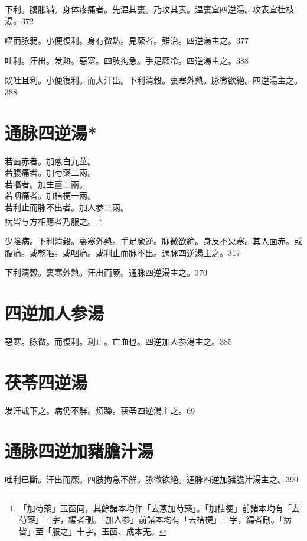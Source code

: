 \documentclass[12pt,twoside,UTF8,b5paper]{ctexbook}
\begin{document}
下利。腹{胀}滿。身体疼痛者。先温其裏。乃攻其表。温裏宜四逆湯。攻表宜桂枝湯。372

嘔而脉弱。小便復利。身有微熱。見厥者。難治。四逆湯主之。377

吐利。汗出。发熱。惡寒。四肢拘急。手足厥冷。四逆湯主之。388

既吐且利。小便復利。而大汗出。下利清穀。裏寒外熱。脉微欲絶。四逆湯主之。388

\section{通脉四逆湯*}

{若}面赤者。加蔥{白}九莖。\\
{若}腹痛者。加芍藥二兩。\\
{若}嘔者。加生薑二兩。\\
{若}咽痛者。加桔梗一兩。\\
{若}利止而脉不出者。加人参二兩。\\
{病皆与方相應者乃服之。}
	\footnote{「加芍藥」玉函同，其餘諸本均作「去蔥加芍藥」。「加桔梗」前諸本均有「去芍藥」三字，編者刪。「加人参」前諸本均有「去桔梗」三字，編者刪。「病皆」至「服之」十字，玉函、成本无。}

少陰病。下利清穀。裏寒外熱。手足厥逆。脉微欲絶。身反不惡寒。其人面赤。或腹痛。或乾嘔。或咽痛。或利止而脉不出。通脉四逆湯主之。317

下利清穀。裏寒外熱。汗出而厥。通脉四逆湯主之。370

\section{四逆加人参湯}

惡寒。脉微。而復利。利止。亡血也。四逆加人参湯主之。385

\section{茯苓四逆湯}

发汗或下之。{病仍}不觧。煩躁。茯苓四逆湯主之。69

\section{通脉四逆加豬膽汁湯}

吐利已斷。汗出而厥。四肢拘急不觧。脉微欲絶。通脉四逆加豬膽汁湯主之。390
\end{document}
